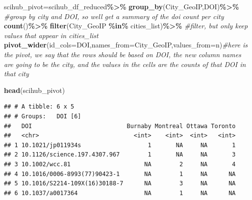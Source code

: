 \documentclass[
]{article}
\newenvironment{Shaded}{\begin{snugshade}}{\end{snugshade}}
\newcommand{\AttributeTok}[1]{\textcolor[rgb]{0.13,0.29,0.53}{#1}}
\newcommand{\CommentTok}[1]{\textcolor[rgb]{0.56,0.35,0.01}{\textit{#1}}}
\newcommand{\FunctionTok}[1]{\textcolor[rgb]{0.13,0.29,0.53}{\textbf{#1}}}
\newcommand{\NormalTok}[1]{#1}
\newcommand{\OtherTok}[1]{\textcolor[rgb]{0.56,0.35,0.01}{#1}}
\newcommand{\SpecialCharTok}[1]{\textcolor[rgb]{0.81,0.36,0.00}{\textbf{#1}}}
\begin{document}
\begin{Shaded}
\begin{Highlighting}[]
\NormalTok{scihub\_pivot}\OtherTok{=}\NormalTok{scihub\_df\_reduced}\SpecialCharTok{\%\textgreater{}\%}
  \FunctionTok{group\_by}\NormalTok{(City\_GeoIP,DOI)}\SpecialCharTok{\%\textgreater{}\%} \CommentTok{\#group by city and DOI, so we\textquotesingle{}ll get a summary of the doi count per city }
  \FunctionTok{count}\NormalTok{()}\SpecialCharTok{\%\textgreater{}\%}
  \FunctionTok{filter}\NormalTok{(City\_GeoIP }\SpecialCharTok{\%in\%}\NormalTok{ cities\_list)}\SpecialCharTok{\%\textgreater{}\%} \CommentTok{\#filter, but only keep values that appear in cities\_list}
  \FunctionTok{pivot\_wider}\NormalTok{(}\AttributeTok{id\_cols=}\NormalTok{DOI,}\AttributeTok{names\_from=}\NormalTok{City\_GeoIP,}\AttributeTok{values\_from=}\NormalTok{n)}\CommentTok{\#here is the pivot, we say that the rows should be based on DOI, the new column names are going to be the city, and the values in the cells are the counts of that DOI in that city}

\FunctionTok{head}\NormalTok{(scihub\_pivot)}
\end{Highlighting}
\end{Shaded}

\begin{verbatim}
## # A tibble: 6 x 5
## # Groups:   DOI [6]
##   DOI                           Burnaby Montreal Ottawa Toronto
##   <chr>                           <int>    <int>  <int>   <int>
## 1 10.1021/jp011934s                   1       NA     NA       1
## 2 10.1126/science.197.4307.967        1       NA     NA       3
## 3 10.1002/wcc.81                     NA        2     NA       4
## 4 10.1016/0006-8993(77)90423-1       NA        1     NA      NA
## 5 10.1016/S2214-109X(16)30188-7      NA        3     NA      NA
## 6 10.1037/a0017364                   NA        1     NA      NA
\end{verbatim}
\end{document}

